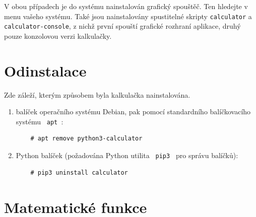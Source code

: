 \documentclass[a4paper, 11pt]{article}
\begin{document}
V obou případech je do systému nainstalován grafický spouštěč. Ten hledejte
v menu vašeho systému. Také jsou nainstalovány spustitelné skripty
\texttt{calculator}     a \texttt{calculator-console}, z nichž první spouští
grafické rozhraní aplikace, druhý pouze konzolovou verzi kalkulačky.

\section{Odinstalace}

Zde záleží, kterým způsobem byla kalkulačka nainstalována.
\begin{enumerate}
    \item balíček operačního systému Debian, pak pomocí standardního balíčkovacího systému \texttt{ apt }:
    \begin{lstlisting}
    # apt remove python3-calculator
    \end{lstlisting}
    \item Python balíček (požadována Python utilita \texttt{ pip3 } pro správu balíčků):
    \begin{lstlisting}
    # pip3 uninstall calculator
    \end{lstlisting}
\end{enumerate}

\section{Matematické funkce}
\end{document}
